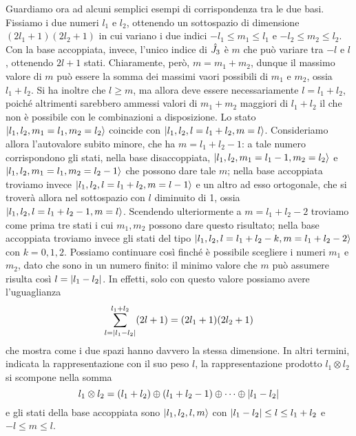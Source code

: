 Guardiamo ora ad alcuni semplici esempi di corrispondenza tra le due basi.
Fissiamo i due numeri $l_1$ e $l_2$, ottenendo un sottospazio di dimensione $(2l_1+1)(2l_2+1)$ in cui variano i due indici $-l_1\le m_1\le l_1$ e $-l_2\le m_2\le l_2$.
Con la base accoppiata, invece, l'unico indice di $\hat{J}_3$ è $m$ che può variare tra $-l$ e $l$, ottenendo $2l+1$ stati.
Chiaramente, però, $m=m_1+m_2$, dunque il massimo valore di $m$ può essere la somma dei massimi vaori possibili di $m_1$ e $m_2$, ossia $l_1+l_2$.
Si ha inoltre che $l\ge m$, ma allora deve essere necessariamente $l=l_1+l_2$, poich\'e altrimenti sarebbero ammessi valori di $m_1+m_2$ maggiori di $l_1+l_2$ il che non è possibile con le combinazioni a disposizione.
Lo stato $\lvert l_1,l_2,m_1=l_1,m_2=l_2\rangle$ coincide con $\lvert l_1,l_2,l=l_1+l_2,m=l\rangle$.
Consideriamo allora l'autovalore subito minore, che ha $m=l_1+l_2-1$: a tale numero corrispondono gli stati, nella base disaccoppiata, $\lvert l_1,l_2,m_1=l_1-1,m_2=l_2\rangle$ e $\lvert l_1,l_2,m_1=l_1,m_2=l_2-1\rangle$ che possono dare tale $m$; nella base accoppiata troviamo invece $\lvert l_1,l_2,l=l_1+l_2,m=l-1\rangle$ e un altro ad esso ortogonale, che si troverà allora nel sottospazio con $l$ diminuito di 1, ossia $\lvert l_1,l_2,l=l_1+l_2-1,m=l\rangle$.
Scendendo ulteriormente a $m=l_1+l_2-2$ troviamo come prima tre stati i cui $m_1,m_2$ possono dare questo risultato; nella base accoppiata troviamo invece gli stati del tipo $\lvert l_1,l_2,l=l_1+l_2-k,m=l_1+l_2-2\rangle$ con $k=0,1,2$.
Possiamo continuare cos\`i finch\'e è possibile scegliere i numeri $m_1$ e $m_2$, dato che sono in un numero finito: il minimo valore che $m$ può assumere risulta cos\`i $l=\lvert l_1-l_2\rvert$.
In effetti, solo con questo valore possiamo avere l'uguaglianza
\begin{equation}
	\sum_{l=\lvert l_1-l_2\rvert}^{l_1+l_2}(2l+1)=(2l_1+1)(2l_2+1)
\end{equation}
che mostra come i due spazi hanno davvero la stessa dimensione.
In altri termini, indicata la rappresentazione con il suo peso $l$, la rappresentazione prodotto $l_1\otimes l_2$ si scompone nella somma
\begin{equation}
	l_1\otimes l_2=(l_1+l_2)\oplus(l_1+l_2-1)\oplus\cdots\oplus\lvert l_1-l_2\rvert
\end{equation}
e gli stati della base accoppiata sono $\lvert l_1,l_2,l,m\rangle$ con $\lvert l_1-l_2\rvert\le l\le l_1+l_2$ e $-l\le m\le l$.

